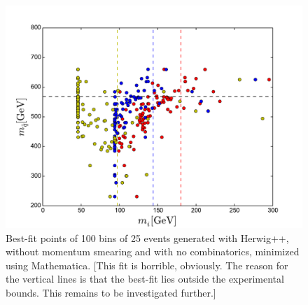 \documentclass[twoside,english]{uiofysmaster}
\begin{document}
\begin{figure}[hbt]
\centering
\includegraphics[scale=0.7]{figures/herwig_mathematica_no_smearing.pdf} 
\caption{Best-fit points of 100 bins of 25 events generated with {\ttfamily Herwig++}, without momentum smearing and with no combinatorics, minimized using Mathematica. [This fit is horrible, obviously. The reason for the vertical lines is that the best-fit lies outside the experimental bounds. This remains to be investigated further.]}
\label{fig:no_combinatorics_best_fit}
\end{figure}




\end{document}

